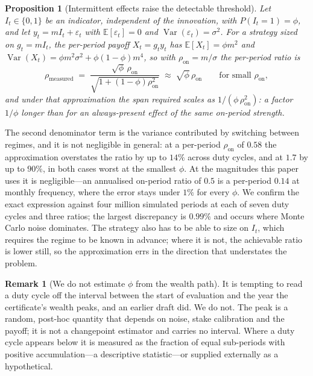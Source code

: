 \documentclass{article}
\theoremstyle{plain}
\newtheorem{proposition}[theorem]{Proposition}
\theoremstyle{definition}
\newtheorem{remark}[theorem]{Remark}
\begin{document}
\begin{proposition}[Intermittent effects raise the detectable threshold]
\label{prop:intermittent}
Let $I_t\in\{0,1\}$ be an indicator, independent of the innovation, with $P(I_t=1)=\phi$, and
let $y_t=m I_t+\varepsilon_t$ with $\mathbb{E}[\varepsilon_t]=0$ and
$\operatorname{Var}(\varepsilon_t)=\sigma^2$. For a strategy sized on $g_t=mI_t$, the
per-period payoff $X_t=g_ty_t$ has $\mathbb{E}[X_t]=\phi m^2$ and
$\operatorname{Var}(X_t)=\phi m^2\sigma^2+\phi(1-\phi)m^4$, so with
$\rho_{\mathrm{on}}=m/\sigma$ the per-period ratio is
\[
  \rho_{\mathrm{measured}}
  \;=\; \frac{\sqrt{\phi}\,\rho_{\mathrm{on}}}
             {\sqrt{1+(1-\phi)\rho_{\mathrm{on}}^{2}}}
  \;\approx\; \sqrt{\phi}\,\rho_{\mathrm{on}}
  \qquad\text{for small }\rho_{\mathrm{on}},
\]
and under that approximation the span required scales as $1/(\phi\,\rho_{\mathrm{on}}^2)$: a
factor $1/\phi$ longer than for an always-present effect of the same on-period strength.
\end{proposition}

The second denominator term is the variance contributed by switching between regimes, and it is
not negligible in general: at a per-period $\rho_{\mathrm{on}}$ of $0.58$ the approximation
overstates the ratio by up to $14\%$ across duty cycles, and at $1.7$ by up to $90\%$, in both
cases worst at the smallest $\phi$. At the magnitudes this paper uses it is negligible---an
annualised on-period ratio of $0.5$ is a per-period $0.14$ at monthly frequency, where the
error stays under $1\%$ for every $\phi$. We confirm the exact expression against four million
simulated periods at each of seven duty cycles and three ratios; the largest discrepancy is
$0.99\%$ and occurs where Monte Carlo noise dominates. The strategy also has to be able
to size on $I_t$, which requires the regime to be known in advance; where it is not, the
achievable ratio is lower still, so the approximation errs in the direction that understates
the problem.

\begin{remark}[We do not estimate $\phi$ from the wealth path]
\label{rem:nophi}
It is tempting to read a duty cycle off the interval between the start of evaluation and the
year the certificate's wealth peaks, and an earlier draft did. We do not. The peak is a random,
post-hoc quantity that depends on noise, stake calibration and the payoff; it is not a
changepoint estimator and carries no interval. Where a duty cycle appears below it is measured
as the fraction of equal sub-periods with positive accumulation---a descriptive statistic---or
supplied externally as a hypothetical.
\end{remark}
\end{document}
